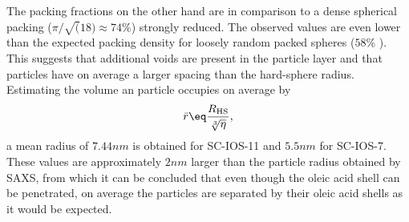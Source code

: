 \documentclass[\main/dresen_thesis.tex]{subfiles}
\begin{document}
  The packing fractions on the other hand are in comparison to a dense spherical packing ($\pi / \sqrt(18) \approx 74 \%$) strongly reduced.
  The observed values are even lower than the expected packing density for loosely random packed spheres ($58 \%$ \cite{Tory_1973_Simul, Shi_2008_Simul}).
  This suggests that additional voids are present in the particle layer and that particles have on average a larger spacing than the hard-sphere radius.
  Estimating the volume an particle occupies on average by
  \begin{align}
    \bar{r} \eq \frac{R_\mathrm{HS}}{\sqrt[3]{\eta}},
  \end{align}
  a mean radius of $7.44 \unit{nm}$ is obtained for SC-IOS-11 and $5.5 \unit{nm}$ for SC-IOS-7.
  These values are approximately $2 \unit{nm}$ larger than the particle radius obtained by SAXS, from which it can be concluded that even though the oleic acid shell can be penetrated, on average the particles are separated by their oleic acid shells as it would be expected.
\end{document}
